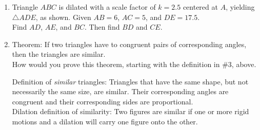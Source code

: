 \documentclass[12pt, twoside]{article}
\begin{document}
\begin{enumerate}
\item Triangle $ABC$ is dilated with a scale factor of $k=2.5$ centered at $A$, yielding $\triangle ADE$, as shown. Given $AB=6$, $AC=5$, and $DE=17.5$. \\[0.25cm] Find $AD$, $AE$, and $BC$. Then find $BD$ and $CE$.
\begin{flushright}
\end{flushright} \vspace{2cm}

\item Theorem: If two triangles have to congruent pairs of corresponding angles, then the triangles are similar. \\[0.5cm]
How would you prove this theorem, starting with the definition in \#3, above.

\newpage
Definition of \emph{similar} triangles: Triangles that have the same shape, but not necessarily the same size, are similar. Their corresponding angles are congruent and their corresponding sides are proportional. \\[1cm]
Dilation definition of similarity: Two figures are similar if one or more rigid motions and a dilation will carry one figure onto the other.

    

\end{enumerate}
\end{document}
